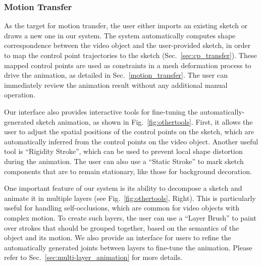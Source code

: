 \subsubsection{Motion Transfer}
As the target for motion transfer, the user either imports an existing sketch or draws a new one in our system.
The system automatically computes shape correspondence between the video object and the user-provided sketch, in order to map the control point trajectories to the sketch (Sec.~\ref{sec:cp_transfer}). These mapped control points are used as constraints in a mesh deformation process to drive the animation, as detailed in Sec.~\ref{motion_transfer}. The user can immediately review the animation result without any additional manual operation.

Our interface also provides interactive tools for fine-tuning the automatically-generated sketch animation, as shown in Fig.~\ref{fig:othertools}. 
First, it allows the user to adjust the spatial positions of the control points on the sketch, which are automatically inferred from the control points on the video object. 
Another useful tool is ``Rigidity Stroke'', which can be used to prevent local shape distortion during the animation.
The user can also use a ``Static Stroke'' to mark sketch components that are to remain stationary, like those for background decoration.

One important feature of our system is its ability to decompose a sketch and animate it in multiple layers (see Fig.~\ref{fig:othertools}, Right). This is particularly useful for handling self-occlusions, which are common for video objects with complex motion. To create such layers, the user can use a ``Layer Brush'' to paint over strokes that should be grouped together, based on the semantics of the object and its motion. We also provide an interface for users to refine the automatically generated joints between layers to fine-tune the animation. Please refer to Sec.~\ref{sec:multi-layer_animation} for more details.

